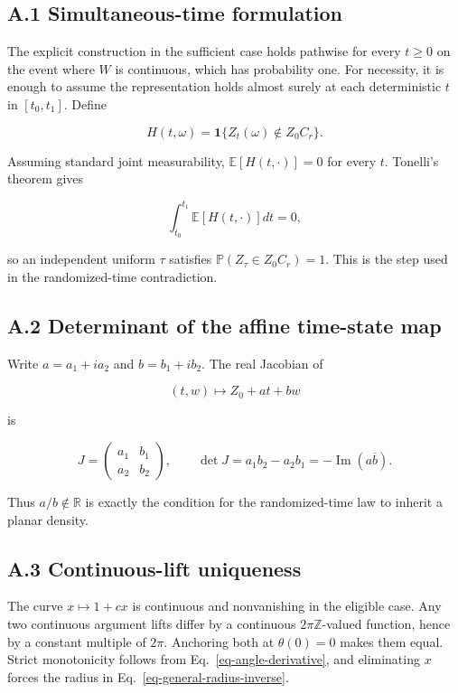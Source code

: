 \documentclass[
  english,
  10pt,
  letterpaper,
  DIV=11,
  numbers=noendperiod]{scrartcl}
\theoremstyle{definition}
\theoremstyle{plain}
\theoremstyle{plain}
\theoremstyle{remark}
\begin{document}
\subsection*{A.1 Simultaneous-time
formulation}\label{a.1-simultaneous-time-formulation}

The explicit construction in the sufficient case holds pathwise for
every \(t\ge0\) on the event where \(W\) is continuous, which has
probability one. For necessity, it is enough to assume the
representation holds almost surely at each deterministic \(t\) in
\([t_0,t_1]\). Define

\[
H(t,\omega)
=
\mathbf 1\{
Z_t(\omega)\notin Z_0C_r
\}.
\]

Assuming standard joint measurability, \(\mathbb E[H(t,\cdot)]=0\) for
every \(t\). Tonelli's theorem gives

\[
\int_{t_0}^{t_1}\mathbb E[H(t,\cdot)]dt=0,
\]

so an independent uniform \(\tau\) satisfies
\(\mathbb P(Z_\tau\in Z_0C_r)=1\). This is the step used in the
randomized-time contradiction.

\subsection*{A.2 Determinant of the affine time-state
map}\label{a.2-determinant-of-the-affine-time-state-map}

Write \(a=a_1+ia_2\) and \(b=b_1+ib_2\). The real Jacobian of

\[
(t,w)\mapsto Z_0+at+bw
\]

is

\[
J=
\begin{pmatrix}
a_1&b_1\\
a_2&b_2
\end{pmatrix},
\qquad
\det J=a_1b_2-a_2b_1
=-\operatorname{Im}(a\overline b).
\]

Thus \(a/b\notin\mathbb R\) is exactly the condition for the
randomized-time law to inherit a planar density.

\subsection*{A.3 Continuous-lift
uniqueness}\label{a.3-continuous-lift-uniqueness}

The curve \(x\mapsto1+cx\) is continuous and nonvanishing in the
eligible case. Any two continuous argument lifts differ by a continuous
\(2\pi\mathbb Z\)-valued function, hence by a constant multiple of
\(2\pi\). Anchoring both at \(\theta(0)=0\) makes them equal. Strict
monotonicity follows from Eq.~\ref{eq-angle-derivative}, and eliminating
\(x\) forces the radius in Eq.~\ref{eq-general-radius-inverse}.
\end{document}
